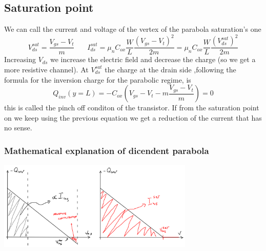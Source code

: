 \vspace{3mm}
\centering
{}
\raggedright
\vspace{3mm}





\subsection{Saturation point}
We can call the current and voltage of the vertex of the parabola saturation's one 
\begin{equation}
V_{ds}^{sat}=\frac{V_{gs}-V_t}{m}\ \ \ \ \ \ \ \ I_{ds}^{sat}=\mu_nC_{ox}\frac{W}{L}\frac{(V_{gs}-V_t)^2}{2m}=\mu_nC_{ox}\frac{W}{L}\frac{(V_{ds}^{sat})^2}{2m}
\end{equation}
Increasing $V_{ds}$ we increase the electric field and decrease the charge (so we get a more resistive channel). At $V_{ds}^{sat}$ the charge at the drain side ,following the formula for the inversion charge for the parabolic regime, is 
\begin{equation}
Q_{inv}(y=L)=-C_{ox}(V_{gs}-V_t-m \frac{V_{gs}-V_t}{m})=0
\end{equation}
this is called the pinch off conditon of the transistor. If from the saturation point on we keep using the previous equation we get a reduction of the current that has no sense.\\

\subsubsection{Mathematical explanation of dicendent parabola}

\centering
\includegraphics[width=0.7\textwidth]{mathexpl.png}\\
\raggedright

